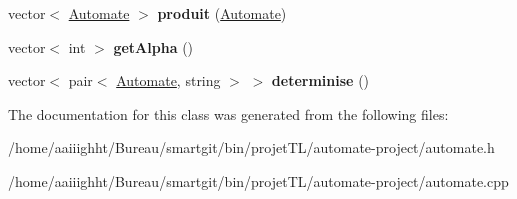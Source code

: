 \begin{DoxyCompactItemize}
\item 
\hypertarget{class_automate_a403a7e9a70bbca142e35a805555c5b16}{vector$<$ \hyperlink{class_automate}{Automate} $>$ {\bfseries produit} (\hyperlink{class_automate}{Automate})}\label{class_automate_a403a7e9a70bbca142e35a805555c5b16}

\item 
\hypertarget{class_automate_ab18acfedc3d9704ab08d8fd464efccfe}{vector$<$ int $>$ {\bfseries get\-Alpha} ()}\label{class_automate_ab18acfedc3d9704ab08d8fd464efccfe}

\item 
\hypertarget{class_automate_aa1829f8d4512f67d4e3efb945cc550f0}{vector$<$ pair$<$ \hyperlink{class_automate}{Automate}, string $>$ $>$ {\bfseries determinise} ()}\label{class_automate_aa1829f8d4512f67d4e3efb945cc550f0}

\end{DoxyCompactItemize}


The documentation for this class was generated from the following files\-:\begin{DoxyCompactItemize}
\item 
/home/aaiiighht/\-Bureau/smartgit/bin/projet\-T\-L/automate-\/project/automate.\-h\item 
/home/aaiiighht/\-Bureau/smartgit/bin/projet\-T\-L/automate-\/project/automate.\-cpp\end{DoxyCompactItemize}
